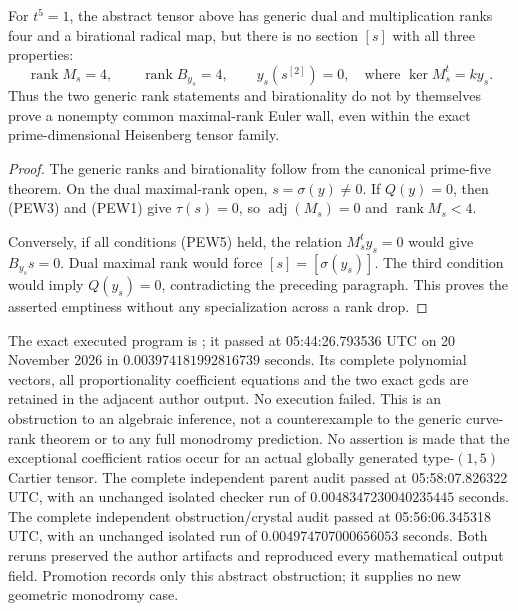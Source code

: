 \begin{proposition}
\label{prop:prime-five-empty-common-wall}
For \(t^5=1\), the abstract tensor above has generic dual and
multiplication ranks four and a birational radical map, but there
is no section \([s]\) with all three properties:
\[
 \operatorname{rank}M_s=4,\qquad
 \operatorname{rank}B_{y_s}=4,\qquad
 y_s(s^{[2]})=0,
 \quad\text{where }\ker M_s^t=k y_s.                 \tag{PEW5}
\]
Thus the two generic rank statements and birationality do not by
themselves prove a nonempty common maximal-rank Euler wall, even
within the exact prime-dimensional Heisenberg tensor family.
\end{proposition}
\begin{proof}
The generic ranks and birationality follow from the canonical
prime-five theorem. On the dual maximal-rank open,
\(s=\sigma(y)\ne0\). If \(Q(y)=0\), then (PEW3) and
(PEW1) give \(\tau(s)=0\), so
\(\operatorname{adj}(M_s)=0\) and \(\operatorname{rank}M_s<4\).

Conversely, if all conditions (PEW5) held, the relation
\(M_s^t y_s=0\) would give \(B_{y_s}s=0\). Dual maximal
rank would force \([s]=[\sigma(y_s)]\). The third condition
would imply \(Q(y_s)=0\), contradicting the preceding paragraph.
This proves the asserted emptiness without any specialization
across a rank drop.
\end{proof}

\begin{remark}
\label{rem:prime-five-empty-wall-scope}
The exact executed program is
; it passed
at 05:44:26.793536 UTC on 20 November 2026 in
\(0.003974181992816739\) seconds. Its complete polynomial vectors,
all proportionality coefficient equations and the two exact gcds
are retained in the adjacent author output. No execution failed.
This is an obstruction to an algebraic inference, not a
counterexample to the generic curve-rank theorem or to any full
monodromy prediction. No assertion is made that the exceptional
coefficient ratios occur for an actual globally generated
type-\((1,5)\) Cartier tensor. The complete independent parent audit passed at 05:58:07.826322 UTC,
with an unchanged isolated checker run of \(0.0048347230040235445\)
seconds. The complete independent obstruction/crystal audit passed at
05:56:06.345318 UTC, with an unchanged isolated run of
\(0.004974707000656053\) seconds. Both reruns preserved the author
artifacts and reproduced every mathematical output field. Promotion
records only this abstract obstruction; it supplies no new geometric
monodromy case.
\end{remark}
